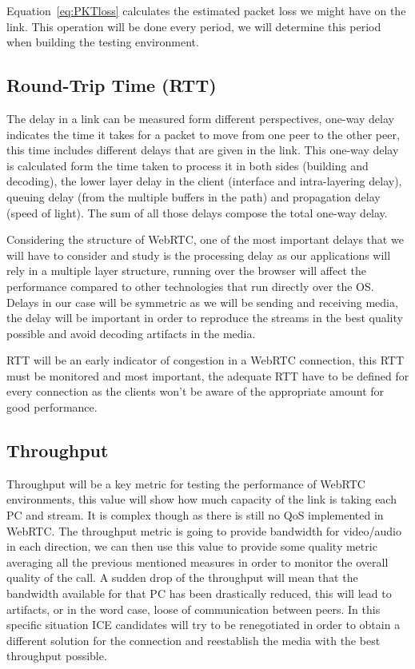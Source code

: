 Equation~\ref{eq:PKTloss} calculates the estimated packet loss we might have on the link. This operation will be done every period, we will determine this period when building the testing environment.

\subsection{Round-Trip Time (RTT)}

The delay in a link can be measured form different perspectives, one-way delay indicates the time it takes for a packet to move from one peer to the other peer, this time includes different delays that are given in the link. This one-way delay is calculated form the time taken to process it in both sides (building and decoding), the lower layer delay in the client (interface and intra-layering delay), queuing delay (from the multiple buffers in the path) and propagation delay (speed of light). The sum of all those delays compose the total one-way delay.

Considering the structure of WebRTC, one of the most important delays that we will have to consider and study is the processing delay as our applications will rely in a multiple layer structure, running over the browser will affect the performance compared to other technologies that run directly over the OS. Delays in our case will be symmetric as we will be sending and receiving media, the delay will be important in order to reproduce the streams in the best quality possible and avoid decoding artifacts in the media. 

RTT will be an early indicator of congestion in a WebRTC connection, this RTT must be monitored and most important, the adequate RTT have to be defined for every connection as the clients won't be aware of the appropriate amount for good performance.

\subsection{Throughput}

Throughput will be a key metric for testing the performance of WebRTC environments, this value will show how much capacity of the link is taking each PC and stream. It is complex though as there is still no QoS implemented in WebRTC. The throughput metric is going to provide bandwidth for video/audio in each direction, we can then use this value to provide some quality metric averaging all the previous mentioned measures in order to monitor the overall quality of the call. A sudden drop of the throughput will mean that the bandwidth available for that PC has been drastically reduced, this will lead to artifacts, or in the word case, loose of communication between peers. In this specific situation ICE candidates will try to be renegotiated in order to obtain a different solution for the connection and reestablish the media with the best throughput possible.

